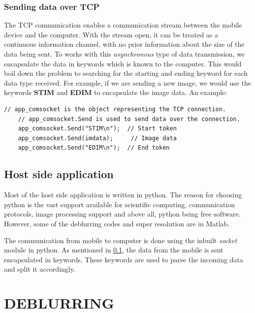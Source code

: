 \documentclass[BTech]{iitmdiss}
\begin{document}
\subsection{Sending data over TCP}
\label{device:device_app:tcp}
The TCP communication enables a communication stream between the mobile
device and the computer. With the stream open, it can be treated as a 
continuous information channel, with no prior information about the size
of the data being sent. To works with this \emph{asynchronous} type of
data transmission, we encapsulate the data in keywords which is known to
the computer. This would boil down the problem to searching for the 
starting and ending keyword for each data type received. For example, if
we are sending a new image, we would use the keywords \textbf{STIM} and
\textbf{EDIM} to encapsulate the image data. An example: 

\begin{singlespacing}
\begin{lstlisting}[style=sharpclisting]
    // app_comsocket is the object representing the TCP connection.
    // app_comsocket.Send is used to send data over the connection.
    app_comsocket.Send("STIM\n");  // Start token
    app_comsocket.Send(imdata);     // Image data
    app_comsocket.Send("EDIM\n");  // End token
\end{lstlisting}
\end{singlespacing}

\section{Host side application}
\label{device:host}
Most of the host side application is written in python. The reason for 
choosing python is the vast support available for scientific computing,
communication protocols, image processing support and above all, python
being free software. However, some of the deblurring codes and 
super resolution are in Matlab.

The communication from mobile to computer is done using the inbuilt
\emph{socket} module in python. As mentioned in 
\ref{device:device_app:tcp}, the data from the mobile is sent
encapsulated in keywords. These keywords are used to parse the incoming
data and split it accordingly. 

\pagebreak

\chapter{DEBLURRING}
\label{chap:deblurring}
\pagebreak
\end{document}
